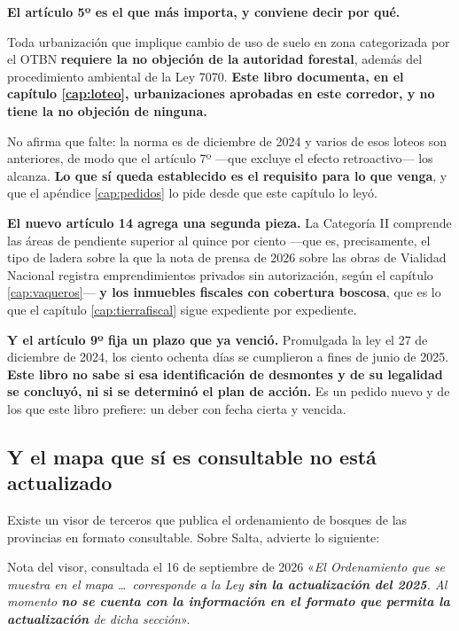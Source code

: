 \begin{cautela}
\textbf{El artículo 5º es el que más importa, y conviene decir por qué.}

Toda urbanización que implique cambio de uso de suelo en zona categorizada por el OTBN
\textbf{requiere la no objeción de la autoridad forestal}, además del procedimiento ambiental de
la Ley 7070. \textbf{Este libro documenta, en el capítulo \ref{cap:loteo}, urbanizaciones
aprobadas en este corredor, y no tiene la no objeción de ninguna.}

No afirma que falte: la norma es de diciembre de 2024 y varios de esos loteos son anteriores, de
modo que el artículo 7º ---que excluye el efecto retroactivo--- los alcanza. \textbf{Lo que sí
queda establecido es el requisito para lo que venga}, y que el apéndice \ref{cap:pedidos} lo pide desde que
este capítulo lo leyó.

\textbf{El nuevo artículo 14 agrega una segunda pieza.} La Categoría II comprende las áreas de
pendiente superior al quince por ciento ---que es, precisamente, el tipo de ladera sobre la que
la nota de prensa de 2026 sobre las obras de Vialidad Nacional registra emprendimientos privados sin autorización, según el
capítulo \ref{cap:vaqueros}--- \textbf{y los inmuebles fiscales con cobertura boscosa}, que es
lo que el capítulo \ref{cap:tierrafiscal} sigue expediente por expediente.

\textbf{Y el artículo 9º fija un plazo que ya venció.} Promulgada la ley el 27 de diciembre de
2024, los ciento ochenta días se cumplieron a fines de junio de 2025. \textbf{Este libro no sabe
si esa identificación de desmontes y de su legalidad se concluyó, ni si se determinó el plan de
acción.} Es un pedido nuevo y de los que este libro prefiere: un deber con fecha cierta y
vencida.
\end{cautela}

\subsection*{Y el mapa que sí es consultable no está actualizado}

Existe un visor de terceros que publica el ordenamiento de bosques de las provincias en formato
consultable. Sobre Salta, advierte lo siguiente:

\begin{ficha}{Nota del visor, consultada el 16 de septiembre de 2026}
«\textit{El Ordenamiento que se muestra en el mapa \ldots\ corresponde a la Ley \textbf{sin la
actualización del 2025}. Al momento \textbf{no se cuenta con la información en el formato que
permita la actualización} de dicha sección}».
\end{ficha}

